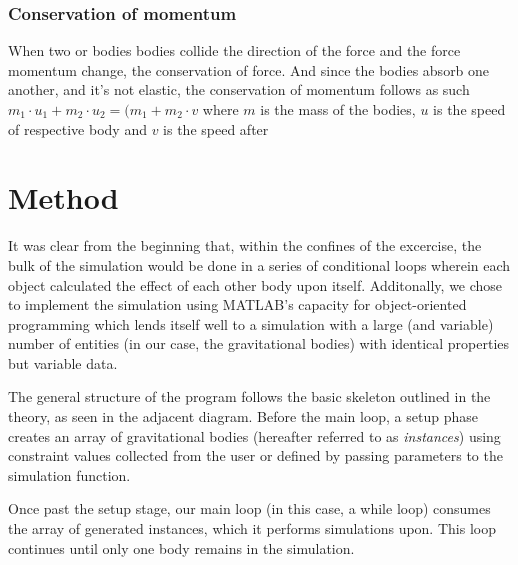 \documentclass[11pt]{article}
\begin{document}
\subsubsection{Conservation of momentum}
When two or bodies bodies collide the direction of the force and the force momentum change, the conservation of force. And since the bodies absorb one another, and it's not elastic, the conservation of momentum follows as such
$m_{1} \cdot u_{1} + m_{2} \cdot u_{2} = (m_{1} + m_{2} \cdot v$
where $m$ is the mass of the bodies, $u$ is the speed of respective body and $v$ is the speed after

\pagebreak
\section{Method}
It was clear from the beginning that, within the confines of the excercise, the bulk of the simulation would be done in a series of conditional loops wherein each object calculated the effect of each other body upon itself. Additonally, we chose to implement the simulation using MATLAB's capacity for object-oriented programming which lends itself well to a simulation with a large (and variable) number of entities (in our case, the gravitational bodies) with identical properties but variable data.

The general structure of the program follows the basic skeleton outlined in the theory, as seen in the adjacent diagram. Before the main loop, a setup phase creates an array of gravitational bodies (hereafter referred to as \emph{instances}) using constraint values collected from the user or defined by passing parameters to the simulation function.

Once past the setup stage, our main loop (in this case, a while loop) consumes the array of generated instances, which it performs simulations upon. This loop continues until only one body remains in the simulation. 
\end{document}
